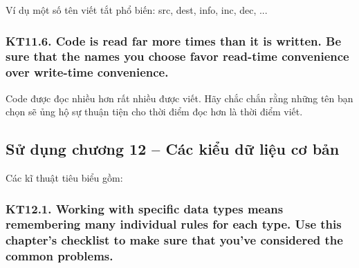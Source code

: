 \documentclass[12pt]{report}
\begin{document}
Ví dụ một số tên viết tắt phổ biến: src, dest, info, inc, dec, ...

\subsubsection{KT11.6. Code is read far more times than it is written. Be sure that the names you choose favor read-time convenience over write-time convenience.}
Code được đọc nhiều hơn rất nhiều được viết. Hãy chắc chắn rằng những tên bạn chọn sẽ ủng hộ sự thuận tiện cho thời điểm đọc hơn là thời điểm viết. 


\subsection{Sử dụng chương 12 -- Các kiểu dữ liệu cơ bản}
\noindent Các kĩ thuật tiêu biểu gồm:
\subsubsection{KT12.1. Working with specific data types means remembering many individual rules for each type. Use this chapter's checklist to make sure that you've considered the common problems.}
\end{document}
